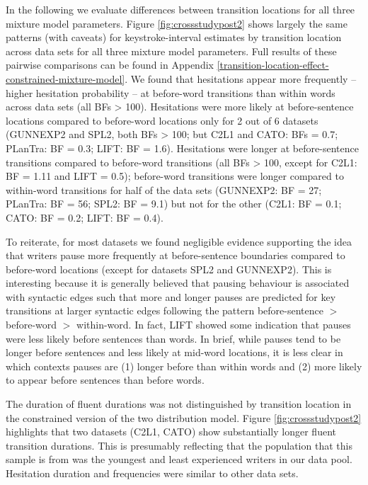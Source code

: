 \documentclass[
  english,
  man,floatsintext]{apa7}
\begin{document}
In the following we evaluate differences between transition locations for all three mixture model parameters. Figure \ref{fig:crossstudypost2} shows largely the same patterns (with caveats) for keystroke-interval estimates by transition location across data sets for all three mixture model parameters. Full results of these pairwise comparisons can be found in Appendix \ref{transition-location-effect-constrained-mixture-model}. We found that hesitations appear more frequently -- higher hesitation probability -- at before-word transitions than within words across data sets (all BFs \textgreater{} 100). Hesitations were more likely at before-sentence locations compared to before-word locations only for 2 out of 6 datasets (GUNNEXP2 and SPL2, both BFs \textgreater{} 100; but C2L1 and CATO: BFs = 0.7; PLanTra: BF = 0.3; LIFT: BF = 1.6). Hesitations were longer at before-sentence transitions compared to before-word transitions (all BFs \textgreater{} 100, except for C2L1: BF = 1.11 and LIFT = 0.5); before-word transitions were longer compared to within-word transitions for half of the data sets (GUNNEXP2: BF = 27; PLanTra: BF = 56; SPL2: BF = 9.1) but not for the other (C2L1: BF = 0.1; CATO: BF = 0.2; LIFT: BF = 0.4).

To reiterate, for most datasets we found negligible evidence supporting the idea that writers pause more frequently at before-sentence boundaries compared to before-word locations (except for datasets SPL2 and GUNNEXP2). This is interesting because it is generally believed that pausing behaviour is associated with syntactic edges such that more and longer pauses are predicted for key transitions at larger syntactic edges following the pattern before-sentence \(>\) before-word \(>\) within-word. In fact, LIFT showed some indication that pauses were less likely before sentences than words. In brief, while pauses tend to be longer before sentences and less likely at mid-word locations, it is less clear in which contexts pauses are (1) longer before than within words and (2) more likely to appear before sentences than before words.

The duration of fluent durations was not distinguished by transition location in the constrained version of the two distribution model. Figure \ref{fig:crossstudypost2} highlights that two datasets (C2L1, CATO) show substantially longer fluent transition durations. This is presumably reflecting that the population that this sample is from was the youngest and least experienced writers in our data pool. Hesitation duration and frequencies were similar to other data sets.
\end{document}
